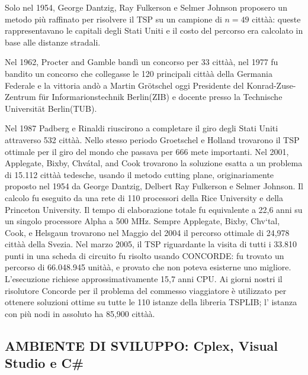 \documentclass[11pt]{article}
\begin{document}
Solo nel 1954, George Dantzig, Ray Fulkerson e Selmer Johnson proposero un metodo più raffinato per risolvere il TSP  su un campione di $n = 49$ città\`a: queste rappresentavano le capitali degli Stati Uniti e il costo del percorso era calcolato in base alle distanze stradali. 

Nel 1962, Procter and Gamble bandì un concorso per 33 città\`a, nel 1977 fu bandito un concorso che collegasse le 120 principali città\`a della Germania Federale e la vittoria andò a Martin Gr\"otschel oggi Presidente del Konrad-Zuse-Zentrum f\"ur Informarionstechnik Berlin(ZIB) e docente presso la Technische Universit\"at Berlin(TUB).

Nel 1987  Padberg e Rinaldi riuscirono a completare il giro degli Stati Uniti attraverso 532 città\`a. Nello stesso periodo Groetschel e Holland trovarono il TSP ottimale per il giro del mondo che passava per 666 mete importanti. 
Nel 2001, Applegate, Bixby, Chvátal, and Cook trovarono la soluzione esatta a un problema di 15.112 città\`a tedesche, usando il metodo cutting plane, originariamente proposto nel 1954 da George Dantzig, Delbert Ray Fulkerson e Selmer Johnson. Il calcolo fu eseguito da una rete di 110 processori della Rice University e della Princeton University. Il tempo di elaborazione totale fu equivalente a 22,6 anni su un singolo processore Alpha a 500 MHz.
Sempre Applegate, Bixby, Chv\a`tal, Cook, e Helsgaun trovarono nel Maggio del 2004 il percorso ottimale di 24,978 città\`a della Svezia. 
Nel marzo 2005, il TSP riguardante la visita di tutti i 33.810 punti in una scheda di circuito fu risolto usando CONCORDE: fu trovato un percorso di 66.048.945 unità\`a, e provato che non poteva esisterne uno migliore. L'esecuzione richiese approssimativamente 15,7 anni CPU. 
Ai giorni nostri il risolutore Concorde per il problema del commesso viaggiatore è utilizzato per ottenere soluzioni ottime su tutte le 110 istanze della libreria TSPLIB; l' istanza con più nodi in assoluto ha 85,900 città\`a. 


\subsection*{AMBIENTE DI SVILUPPO: Cplex, Visual Studio e C\#}
\end{document}
